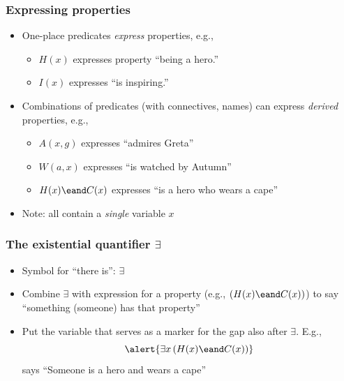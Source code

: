 \begin{frame}
\frametitle{Expressing properties}

  \begin{itemize}[<+->]
    \item One-place predicates \emph{express} properties, e.g.,
    \begin{itemize}[<+->]
      \item $H(x)$ expresses property ``being a hero.''
      \item $I(x)$ expresses ``is inspiring.''
    \end{itemize}
    \item Combinations of predicates (with connectives, names) can
    express \emph{derived} properties, e.g.,
    \begin{itemize}[<+->]
      \item $A(x, g)$ expresses ``admires Greta''
      \item $W(a, x)$ expresses ``is watched by Autumn''
      \item $H(x) \eand C(x)$ expresses ``is a hero who wears a cape''
    \end{itemize}
    \item Note: all contain a \emph{single} variable $x$
  \end{itemize}
\end{frame}

\begin{frame}
  \frametitle{The existential quantifier $\exists$}

  \begin{itemize}[<+->]
    \item Symbol for ``there is'': \alert{$\exists$}
    \item Combine $\exists$ with expression for a property (e.g., $(H(x) \eand
    C(x))$) to say ``something (someone) has that property''
    \item Put the variable that serves as a marker for the gap also
    after $\exists$. E.g.,
    \[ \alert{\exists x\,(H(x) \eand C(x))} \]
    says ``Someone is a hero and wears a cape''
  \end{itemize}
\end{frame}

